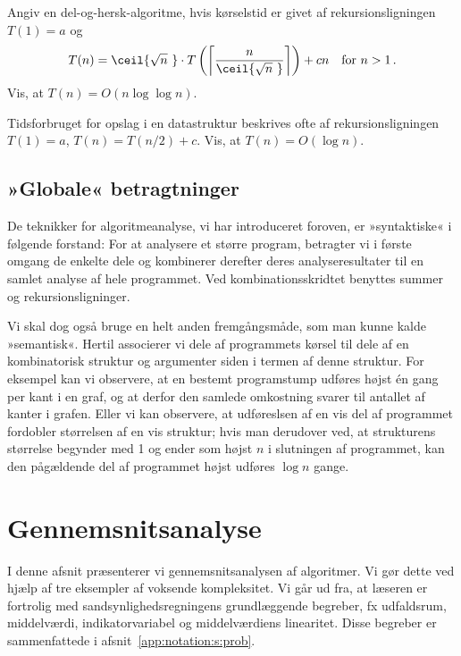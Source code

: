\begin{exerc}
  Angiv en del-og-hersk-algoritme, hvis kørselstid er givet af rekursionsligningen
  $T(1)=a$ og \[
    T(n)=\ceil{\sqrt{n}\,\,}\cdot T\left(\left\lceil\frac{n}{\ceil{\sqrt{n}\,\,}}\right\rceil\right)  + cn\quad \text{for }n>1\,.\]
  Vis, at $T(n)=O(n\log\log n)$.
\end{exerc}

\begin{exerc}
  Tidsforbruget for opslag i en datastruktur beskrives ofte af rekursionsligningen
$T(1)=a$, $T(n)=T(n/2) + c$.
Vis, at $T(n)=O(\log n)$.
\end{exerc}

\subsection{»Globale« betragtninger} 

De teknikker for algoritmeanalyse, vi har introduceret foroven, er »syntaktiske« i følgende forstand:
For at analysere et større program, betragter vi i første omgang de enkelte dele og kombinerer derefter deres analyseresultater til en samlet analyse af hele programmet.
Ved kombinationsskridtet benyttes summer og rekursionsligninger.

Vi skal dog også bruge en helt anden fremgångsmåde, som man kunne kalde »semantisk«.
Hertil associerer vi dele af programmets kørsel til dele af en kombinatorisk struktur og argumenter siden i termen af denne struktur.
For eksempel kan vi observere, at en bestemt programstump udføres højst én gang per kant i en graf, og at derfor den samlede omkostning svarer til antallet af kanter i grafen.
Eller vi kan observere, at udføreslsen af en vis del af programmet fordobler størrelsen af en vis struktur;
hvis man derudover ved, at strukturens størrelse begynder med 1 og ender som højst $n$ i slutningen af programmet, kan den pågældende del af programmet højst udføres $\log n$ gange.

\section{Gennemsnitsanalyse}


%
I denne afsnit præsenterer vi gennemsnitsanalysen af algoritmer.
Vi gør dette ved hjælp af tre eksempler af voksende kompleksitet. 
Vi går ud fra, at læseren er fortrolig med sandsynlighedsregningens grundlæggende begreber, fx udfaldsrum, middelværdi, indikatorvariabel og middelværdiens linearitet.
Disse begreber er sammenfattede i afsnit~\ref{app:notation:s:prob}.
% 
% 
% 
% 
% 

